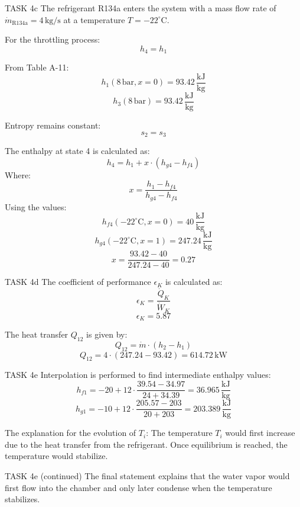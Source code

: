 TASK 4c  
The refrigerant R134a enters the system with a mass flow rate of \( \dot{m}_{\text{R134a}} = 4 \, \text{kg/s} \) at a temperature \( T = -22^\circ\text{C} \).  

For the throttling process:  
\[
h_4 = h_1
\]  

From Table A-11:  
\[
h_1(8 \, \text{bar}, x = 0) = 93.42 \, \frac{\text{kJ}}{\text{kg}}
\]  
\[
h_3(8 \, \text{bar}) = 93.42 \, \frac{\text{kJ}}{\text{kg}}
\]  

Entropy remains constant:  
\[
s_2 = s_3
\]  

The enthalpy at state 4 is calculated as:  
\[
h_4 = h_1 + x \cdot (h_{g4} - h_{f4})
\]  
Where:  
\[
x = \frac{h_1 - h_{f4}}{h_{g4} - h_{f4}}
\]  
Using the values:  
\[
h_{f4}(-22^\circ\text{C}, x = 0) = 40 \, \frac{\text{kJ}}{\text{kg}}
\]  
\[
h_{g4}(-22^\circ\text{C}, x = 1) = 247.24 \, \frac{\text{kJ}}{\text{kg}}
\]  
\[
x = \frac{93.42 - 40}{247.24 - 40} = 0.27
\]  

TASK 4d  
The coefficient of performance \( \epsilon_K \) is calculated as:  
\[
\epsilon_K = \frac{\dot{Q}_K}{\dot{W}_K}
\]  
\[
\epsilon_K = 5.87
\]  

The heat transfer \( Q_{12} \) is given by:  
\[
Q_{12} = \dot{m} \cdot (h_2 - h_1)
\]  
\[
Q_{12} = 4 \cdot (247.24 - 93.42) = 614.72 \, \text{kW}
\]  

TASK 4e  
Interpolation is performed to find intermediate enthalpy values:  
\[
h_{f1} = -20 + 12 \cdot \frac{39.54 - 34.97}{24 + 34.39} = 36.965 \, \frac{\text{kJ}}{\text{kg}}
\]  
\[
h_{g1} = -10 + 12 \cdot \frac{205.57 - 203}{20 + 203} = 203.389 \, \frac{\text{kJ}}{\text{kg}}
\]  

The explanation for the evolution of \( T_i \):  
The temperature \( T_i \) would first increase due to the heat transfer from the refrigerant. Once equilibrium is reached, the temperature would stabilize.  

TASK 4e (continued)  
The final statement explains that the water vapor would first flow into the chamber and only later condense when the temperature stabilizes.
